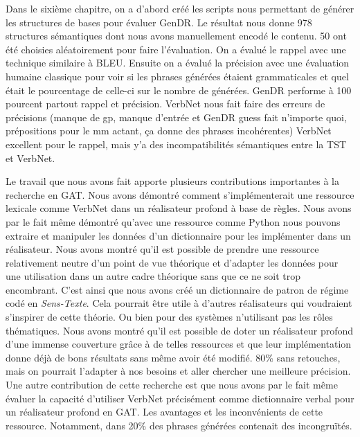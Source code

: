 Dans le sixième chapitre, on a d'abord créé les scripts nous permettant de générer les structures de bases pour évaluer GenDR. Le résultat nous donne 978 structures sémantiques dont nous avons manuellement encodé le contenu. 50 ont été choisies aléatoirement pour faire l'évaluation. On a évalué le rappel avec une technique similaire à BLEU. Ensuite on a évalué la précision avec une évaluation humaine classique pour voir si les phrases générées étaient grammaticales et quel était le pourcentage de celle-ci sur le nombre de générées. GenDR performe à 100 pourcent partout rappel et précision. VerbNet nous fait faire des erreurs de précisions (manque de gp, manque d'entrée et GenDR guess fait n'importe quoi, prépositions pour le mm actant, ça donne des phrases incohérentes) VerbNet excellent pour le rappel, mais y'a des incompatibilités sémantiques entre la TST et VerbNet.  

Le travail que nous avons fait apporte plusieurs contributions importantes à la recherche en \ac{GAT}. Nous avons démontré comment s'implémenterait une ressource lexicale comme VerbNet dans un réalisateur profond à base de règles. Nous avons par le fait même démontré qu'avec une ressource comme Python nous pouvons extraire et manipuler les données d'un dictionnaire pour les implémenter dans un réalisateur. Nous avons montré qu'il est possible de prendre une ressource relativement neutre d'un point de vue théorique et d'adapter les données pour une utilisation dans un autre cadre théorique sans que ce ne soit trop encombrant. C'est ainsi que nous avons créé un dictionnaire de patron de régime codé en \emph{Sens-Texte}. Cela pourrait être utile à d'autres réalisateurs qui voudraient s'inspirer de cette théorie. Ou bien pour des systèmes n'utilisant pas les rôles thématiques. Nous avons montré qu'il est possible de doter un réalisateur profond d'une immense couverture grâce à de telles ressources et que leur implémentation donne déjà de bons résultats sans même avoir été modifié. 80\% sans retouches, mais on pourrait l'adapter à nos besoins et aller chercher une meilleure précision. Une autre contribution de cette recherche est que nous avons par le fait même évaluer la capacité d'utiliser VerbNet précisément comme dictionnaire verbal pour un réalisateur profond en GAT. Les avantages et les inconvénients de cette ressource. Notamment, dans 20\% des phrases générées contenait des incongruïtés.

